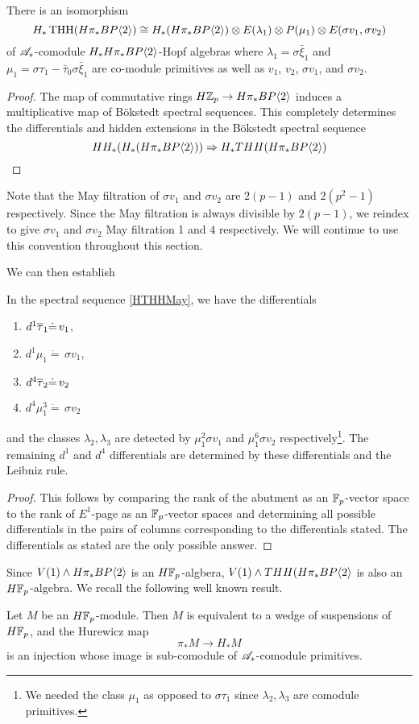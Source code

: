 \begin{prop} \label{prop:homologyTHH-E0} There is an isomorphism
\[
H_*\operatorname{THH}(H\pi_*BP\langle 2 \rangle)\cong H_*(H\pi_*BP\langle 2 \rangle)\otimes E(\lambda_1)\otimes P(\mu_1)\otimes E(\sigma v_1,\sigma v_2)
\]
of $\mathscr{A}_*$-comodule $H_*H\pi_*BP\langle 2 \rangle$-Hopf algebras where $\lambda_1=\sigma \bar{\xi}_1$ and $\mu_1=\sigma \tau_1 -\bar{\tau}_0\sigma \bar{\xi}_1$ are co-module primitives as well as $v_1$, $v_2$, $\sigma v_1$, and $\sigma v_2$.
\end{prop}
\begin{proof}
The map of commutative rings
$
H\mathbb{Z}_p\to H\pi_*BP\langle 2 \rangle 
$
induces a multiplicative map of B\"okstedt spectral sequences. This completely determines the differentials and hidden extensions in the B\"okstedt spectral sequence
\[ HH_*(H_*(H\pi_*BP\langle 2 \rangle))\Rightarrow H_*THH(H\pi_*BP\langle 2 \rangle)\]
\end{proof}
\begin{rem}
Note that the May filtration of $\sigma v_1$ and $\sigma v_2$ are $2(p-1)$ and $2(p^2-1)$ respectively. Since the May filtration is always divisible by $2(p-1)$, we reindex to give $\sigma v_1$ and $\sigma v_2$ May filtration 1 and $4$ respectively. We will continue to use this convention throughout this section. 
\end{rem}
We can then establish
\begin{prop}
	In the spectral sequence \eqref{HTHHMay}, we have the differentials 
	\begin{enumerate}
		\item $d^1\overline{\tau}_1\dot{=}\, v_1$,
		\item $d^1\mu_1\dot{=}\, \sigma v_1$,
		\item $d^{4}\overline{\tau}_2\dot{=}\, v_2$
		\item $d^{4}\mu_1^3\dot{=}\, \sigma v_2$
	\end{enumerate}
and the classes $\lambda_2, \lambda_3$ are detected by $\mu_1^2\sigma v_1$ and $\mu_1^6\sigma v_2$ respectively\footnote{We needed the class $\mu_1$ as opposed to $\sigma \tau_1$ since $\lambda_2, \lambda_3$ are comodule primitives.}. The remaining $d^1$ and $d^4$ differentials are determined by these differentials and the Leibniz rule.
\end{prop}
\begin{proof}
This follows by comparing the rank of the abutment as an $\mathbb{F}_p$-vector space to the rank of $E^1$-page as an $\mathbb{F}_p$-vector spaces and determining all possible differentials in the pairs of columns corresponding to the differentials stated. The differentials as stated are the only possible answer. 
\end{proof}
Since $V(1)\wedge H\pi_*BP\langle 2 \rangle$ is an $H\mathbb{F}_p$-algbera, $V(1)\wedge THH(H\pi_*BP\langle 2 \rangle$ is also an $H\mathbb{F}_p$-algebra. We recall the following well known result.
\begin{lem}
	Let $M$ be an $H\mathbb{F}_p$-module. Then $M$ is equivalent to a wedge of suspensions of $H\mathbb{F}_p$, and the Hurewicz map 
	\[
	\pi_*M\to H_*M
	\]
	is an injection whose image is sub-comodule of $\mathscr{A}_*$-comodule primitives. 
\end{lem}

